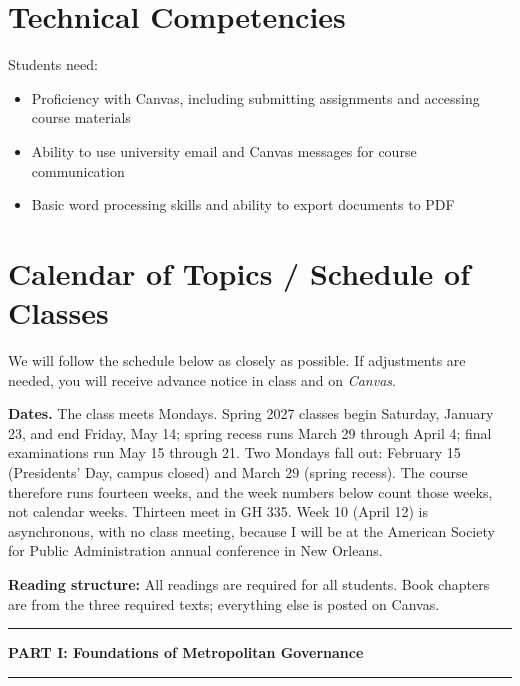 \documentclass[12pt]{article}
\begin{document}
\section*{Technical Competencies}
Students need:
\begin{itemize}
\item Proficiency with Canvas, including submitting assignments and accessing course materials
\item Ability to use university email and Canvas messages for course communication
\item Basic word processing skills and ability to export documents to PDF
\end{itemize}

\section*{Calendar of Topics / Schedule of Classes}

We will follow the schedule below as closely as possible. If adjustments are needed, you will receive advance notice in class and on \emph{Canvas}.

\vspace{0.5em}
\noindent \textbf{Dates.} The class meets Mondays. Spring 2027 classes begin Saturday, January 23, and end Friday, May 14; spring recess runs March 29 through April 4; final examinations run May 15 through 21. Two Mondays fall out: February 15 (Presidents' Day, campus closed) and March 29 (spring recess). The course therefore runs fourteen weeks, and the week numbers below count those weeks, not calendar weeks. Thirteen meet in GH 335. Week 10 (April 12) is asynchronous, with no class meeting, because I will be at the American Society for Public Administration annual conference in New Orleans.

\vspace{0.5em}
\noindent \textbf{Reading structure:} All readings are required for all students. Book chapters are from the three required texts; everything else is posted on Canvas.

\bigskip

\noindent\rule{\textwidth}{0.6pt}
\begin{center}\textbf{PART I: Foundations of Metropolitan Governance}\end{center}
\noindent\rule{\textwidth}{0.6pt}
\end{document}
